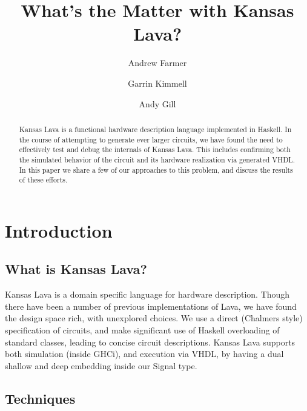 \documentclass{llncs}
\begin{document}
\title{What's the Matter with Kansas Lava?}

\author{Andrew Farmer \and Garrin Kimmell \and Andy Gill}


\maketitle

\begin{abstract}
Kansas Lava is a functional hardware description language implemented
in Haskell. In the course of attempting to generate ever larger circuits,
we have found the need to effectively test and debug the internals of
Kansas Lava. This includes confirming both the simulated behavior of the
circuit and its hardware realization via generated VHDL. In
this paper we share a few of our approaches to this problem, and discuss
the results of these efforts.
\end{abstract}

\section{Introduction}

\subsection{What is Kansas Lava?}

Kansas Lava is a domain specific language for hardware description.
Though there have been a number of previous implementations
of Lava, we have found the design space rich, with unexplored choices.
We use a direct (Chalmers style) specification of circuits, and make
significant use of Haskell overloading of standard classes, leading to
concise circuit descriptions. Kansas Lava supports both simulation (inside
GHCi), and execution via VHDL, by having a dual shallow and deep
embedding inside our Signal type. 

\subsection{Techniques}
\end{document}
